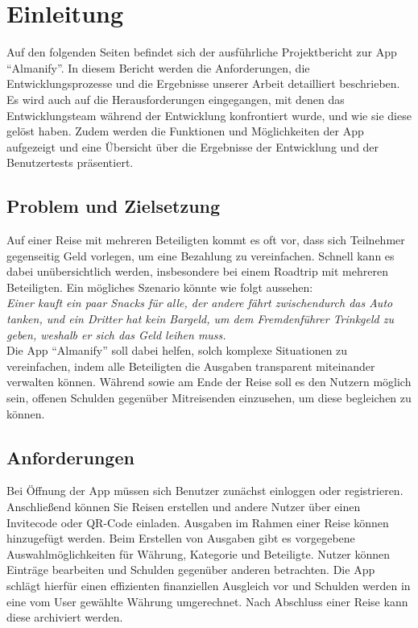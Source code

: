 \section{Einleitung}

Auf den folgenden Seiten befindet sich der ausführliche Projektbericht zur App \enquote{Almanify}.
In diesem Bericht werden die Anforderungen, die Entwicklungsprozesse und die Ergebnisse unserer Arbeit detailliert beschrieben.
Es wird auch auf die Herausforderungen eingegangen, mit denen das Entwicklungsteam während der Entwicklung konfrontiert wurde, und wie sie diese gelöst haben.
Zudem werden die Funktionen und Möglichkeiten der App aufgezeigt und eine Übersicht über die Ergebnisse der Entwicklung und der Benutzertests präsentiert.

\subsection{Problem und Zielsetzung}

Auf einer Reise mit mehreren Beteiligten kommt es oft vor, dass sich Teilnehmer gegenseitig Geld vorlegen, um eine Bezahlung zu vereinfachen.
Schnell kann es dabei unübersichtlich werden, insbesondere bei einem Roadtrip mit mehreren Beteiligten.
Ein mögliches Szenario könnte wie folgt aussehen:\\
\textit{Einer kauft ein paar Snacks für alle, der andere fährt zwischendurch das Auto tanken,
  und ein Dritter hat kein Bargeld, um dem Fremdenführer Trinkgeld zu geben, weshalb er sich das Geld leihen muss.}\\
Die App \enquote{Almanify} soll dabei helfen, solch komplexe Situationen zu vereinfachen, indem alle Beteiligten die Ausgaben transparent miteinander verwalten können.
Während sowie am Ende der Reise soll es den Nutzern möglich sein, offenen Schulden gegenüber Mitreisenden einzusehen, um diese begleichen zu können.

\subsection{Anforderungen}

Bei Öffnung der App müssen sich Benutzer zunächst einloggen oder registrieren.
Anschließend können Sie Reisen erstellen und andere Nutzer über einen Invitecode oder QR-Code einladen.
Ausgaben im Rahmen einer Reise können hinzugefügt werden.
Beim Erstellen von Ausgaben gibt es vorgegebene Auswahlmöglichkeiten für Währung, Kategorie und Beteiligte.
Nutzer können Einträge bearbeiten und Schulden gegenüber anderen betrachten.
Die App schlägt hierfür einen effizienten finanziellen Ausgleich vor und Schulden werden in eine vom User gewählte Währung umgerechnet.
Nach Abschluss einer Reise kann diese archiviert werden.

